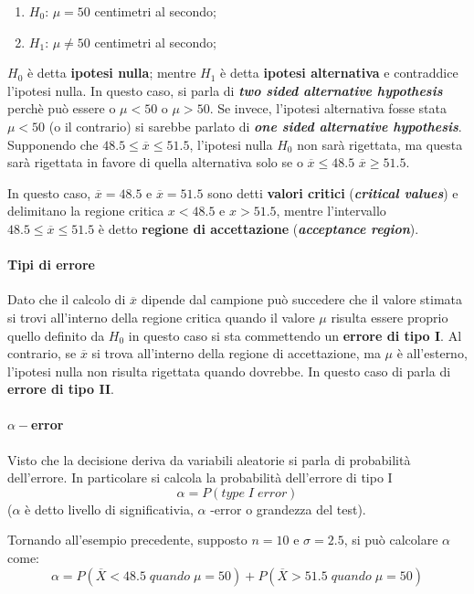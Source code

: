 \documentclass{article}
\begin{document}
\begin{enumerate}[label=(\alph*)]
  \item $H_0$: $\mu = 50$ centimetri al secondo;
  \item $H_1$: $\mu \neq 50$ centimetri al secondo;
\end{enumerate}

$H_0$ è detta \textbf{ipotesi nulla}; mentre $H_1$ è detta \textbf{ipotesi alternativa} e 
contraddice l'ipotesi nulla. In questo caso, si parla di \textbf{\textit{two sided 
alternative hypothesis}} perchè può essere o $\mu < 50$ o $\mu > 50$. Se invece, l'ipotesi 
alternativa fosse stata $\mu < 50$ (o il contrario) si sarebbe parlato di 
\textbf{\textit{one sided alternative hypothesis}}.
Supponendo che $48.5 \leq \overline{x} \leq 51.5$, l'ipotesi nulla $H_0$ non sarà rigettata,
ma questa sarà rigettata in favore di quella alternativa solo se o $\overline{x} \leq 48.5$
$\overline{x} \geq 51.5$. 

In questo caso, $\overline{x} = 48.5$ e $\overline{x} = 51.5$ sono detti \textbf{valori 
critici} (\textbf{\textit{critical values}}) e delimitano la regione critica $x < 48.5$ e 
$x > 51.5 $, mentre l'intervallo $48.5 \leq \overline{x} \leq 51.5$ è detto \textbf{regione
di accettazione} (\textbf{\textit{acceptance region}}).

\paragraph{Tipi di errore}
Dato che il calcolo di $\overline{x}$ dipende dal campione può succedere che il valore stimata
si trovi all'interno della regione critica quando il valore $\mu$ risulta essere proprio 
quello definito da $H_0$ in questo caso si sta commettendo un \textbf{errore di tipo I}. Al 
contrario, se $\overline{x}$ si trova all'interno della regione di accettazione, ma $\mu$ 
è all'esterno, l'ipotesi nulla non risulta rigettata quando dovrebbe. In questo caso di parla 
di \textbf{errore di tipo II}.

\paragraph{$\alpha-$error}
Visto che la decisione deriva da variabili aleatorie 
si parla di probabilità dell'errore. In particolare si calcola la probabilità dell'errore di 
tipo I $$\alpha = P(type\; I\; error)$$ ($\alpha$ è detto livello di significativia, $\alpha$ 
-error o grandezza del test).


Tornando all'esempio precedente, supposto $n = 10$ e $\sigma = 2.5$, si può calcolare $\alpha$ 
come:
\begin{equation*}
  \alpha = P(\overline{X} < 48.5\;quando\; \mu = 50) + P(\overline{X} > 51.5\;quando\; 
  \mu = 50)
\end{equation*}
\end{document}
